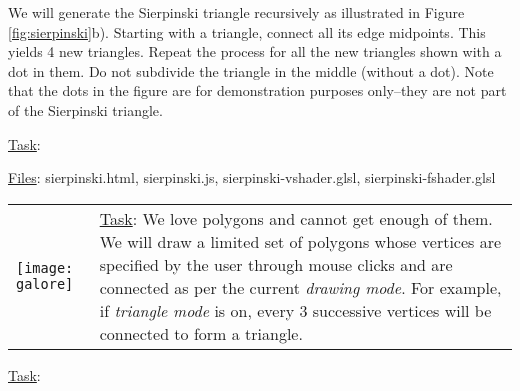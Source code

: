 \documentclass[addpoints]{exam}
\begin{document}
\begin{questions}
We will generate the Sierpinski triangle recursively as illustrated in Figure \ref{fig:sierpinski}b). Starting with a triangle, connect all its edge midpoints. This yields 4 new triangles. Repeat the process for all the new triangles shown with a dot in them. Do not subdivide the triangle in the middle (without a dot). Note that the dots in the figure are for demonstration purposes only--they are not part of the Sierpinski triangle.

\underline{Task}:
  \underline{Files}: sierpinski.html, sierpinski.js, sierpinski-vshader.glsl, sierpinski-fshader.glsl


  \label{q:galore}
  
  \begin{tabularx}{\linewidth}{lX}
    \texttt{[image: galore]}
    &
      \vspace{20pt} \underline{Task}: We love polygons and cannot get enough of them. We will draw a limited set of polygons whose vertices are specified by the user through mouse clicks and are connected as per the current \textit{drawing mode}. For example, if \textit{triangle mode} is on, every 3 successive vertices will be connected to form a triangle.
  \end{tabularx}

  \vspace{-15pt}
  \underline{Task}: 
\end{questions}
\end{document}
